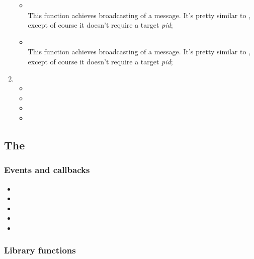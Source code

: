 \begin{enumerate}
\begin{itemize}
            \item {} \\
                This function achieves broadcasting of a message. It's
                pretty similar to , except of course it
                doesn't require a target \emph{pid};

            \item {} \\
                This function achieves broadcasting of a message. It's
                pretty similar to , except of course it
                doesn't require a target \emph{pid};

            \end{itemize}

        \item   {}

            \begin{itemize}
            \item {}
            \item {}
            \item {}
            \item {}
            \end{itemize}

        \end{enumerate}

\subsection{The  }

    \subsubsection{Events and callbacks}
        \begin{itemize}
        \item {}
        \item {}
        \item {}
        \item {}
        \item {}
        \end{itemize}

    \subsubsection{Library functions}

